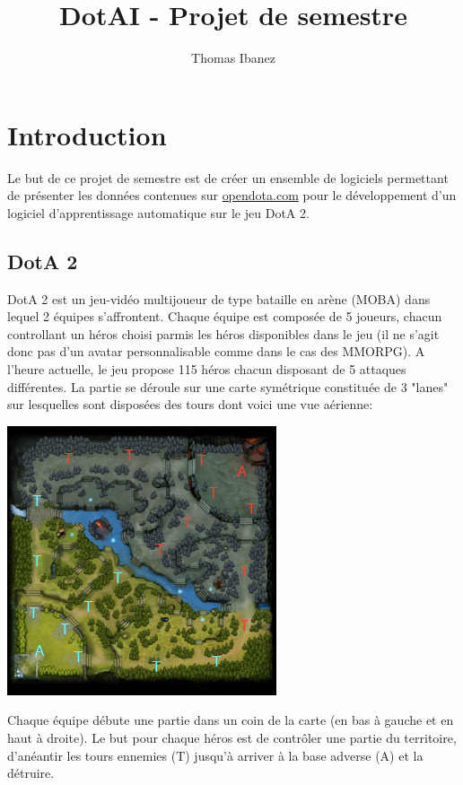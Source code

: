 \documentclass{article}
\title{DotAI - Projet de semestre}
\author{Thomas Ibanez}
\begin{document}
\maketitle

\newpage
\tableofcontents

\newpage

\section{Introduction}

Le but de ce projet de semestre est de créer un ensemble de logiciels permettant de présenter les données contenues sur \url{opendota.com} pour le développement d'un logiciel d'apprentissage automatique sur le jeu DotA 2.

\subsection{DotA 2}

DotA 2 est un jeu-vidéo multijoueur de type bataille en arène (MOBA) dans lequel 2 équipes s'affrontent. Chaque équipe est composée de 5 joueurs, chacun controllant un héros choisi parmis les héros disponibles dans le jeu (il ne s'agit donc pas d'un avatar personnalisable comme dans le cas des MMORPG). A l'heure actuelle, le jeu propose 115 héros chacun disposant de 5 attaques différentes. La partie se déroule sur une carte symétrique constituée de 3 "lanes" sur lesquelles sont disposées des tours dont voici une vue aérienne: \\
\begin{center}
	\includegraphics[scale=1]{"minimap.png"} 
\end{center}

Chaque équipe débute une partie dans un coin de la carte (en bas à gauche et en haut à droite). Le but pour chaque héros est de contrôler une partie du territoire, d'anéantir les tours ennemies (T) jusqu'à arriver à la base adverse (A) et la détruire.\\
\end{document}
